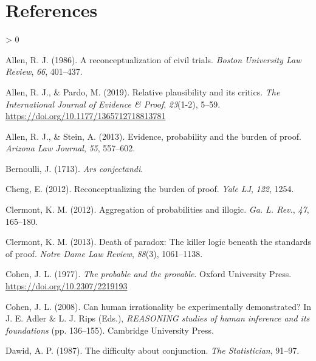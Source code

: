 \documentclass[
  10pt,
  dvipsnames,enabledeprecatedfontcommands]{scrartcl}
\newlength{\cslhangindent}
\newenvironment{CSLReferences}[2] %
 {%
  \setlength{\parindent}{0pt}
  \ifodd #1 \everypar{\setlength{\hangindent}{\cslhangindent}}\ignorespaces\fi
  \ifnum #2 > 0
  \setlength{\parskip}{#2\baselineskip}
  \fi
 }%
 {}
\begin{document}
\hypertarget{references}{%
\section*{References}\label{references}}

\hypertarget{refs}{}
\begin{CSLReferences}{1}{0}
\leavevmode\hypertarget{ref-Allen1986A-Reconceptuali}{}%
Allen, R. J. (1986). A reconceptualization of civil trials. \emph{Boston
University Law Review}, \emph{66}, 401--437.

\leavevmode\hypertarget{ref-AllenPardo2019relative}{}%
Allen, R. J., \& Pardo, M. (2019). Relative plausibility and its
critics. \emph{The International Journal of Evidence {\&} Proof},
\emph{23}(1-2), 5--59. \url{https://doi.org/10.1177/1365712718813781}

\leavevmode\hypertarget{ref-allen2013}{}%
Allen, R. J., \& Stein, A. (2013). Evidence, probability and the burden
of proof. \emph{Arizona Law Journal}, \emph{55}, 557--602.

\leavevmode\hypertarget{ref-Bernoulli1713Ars-conjectandi}{}%
Bernoulli, J. (1713). \emph{Ars conjectandi}.

\leavevmode\hypertarget{ref-cheng2012reconceptualizing}{}%
Cheng, E. (2012). Reconceptualizing the burden of proof. \emph{Yale LJ},
\emph{122}, 1254.

\leavevmode\hypertarget{ref-clermont2012aggregation}{}%
Clermont, K. M. (2012). Aggregation of probabilities and illogic.
\emph{Ga. L. Rev.}, \emph{47}, 165--180.

\leavevmode\hypertarget{ref-clermont2013paradox}{}%
Clermont, K. M. (2013). Death of paradox: The killer logic beneath the
standards of proof. \emph{Notre Dame Law Review}, \emph{88}(3),
1061--1138.

\leavevmode\hypertarget{ref-Cohen1977The-probable-an}{}%
Cohen, J. L. (1977). \emph{The probable and the provable}. Oxford
University Press. \url{https://doi.org/10.2307/2219193}

\leavevmode\hypertarget{ref-cohen1981can}{}%
Cohen, J. L. (2008). Can human irrationality be experimentally
demonstrated? In J. E. Adler \& L. J. Rips (Eds.), \emph{REASONING
studies of human inference and its foundations} (pp. 136--155).
Cambridge University Press.

\leavevmode\hypertarget{ref-dawid1987difficulty}{}%
Dawid, A. P. (1987). The difficulty about conjunction. \emph{The
Statistician}, 91--97.


\end{CSLReferences}
\end{document}
